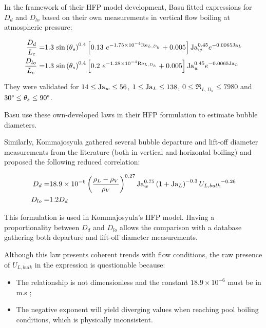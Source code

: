 \npar

In the framework of their HFP model development, Basu \etal fitted expressions for $D_{d}$ and $D_{lo}$ based on their own measurements in vertical flow boiling at atmospheric pressure:

\begin{align}
\frac{D_{d}}{L_{c}} =& 1.3~\sin{\theta_{s}}^{0.4}\crocht{ 0.13\ e^{-1.75\times 10^{-4} \Re_{L,D_{h}}}+0.005 }\Ja_{w}^{0.45}e^{-0.0065\Ja_{L}}
\label{eq:dd_basu}\\
%
\frac{D_{lo}}{L_{c}} =& 1.3~ \sin{\theta_{s}}^{0.4}\crocht{ 0.2\ e^{-1.28\times 10^{-4} \Re_{L,D_{h}}}+0.005 }\Ja_{w}^{0.45}e^{-0.0065\Ja_{L}}
\label{eq:dlo_basu}
\end{align}

They were validated for $14 \leq \mathrm{Ja}_{w} \leq 56$, $1 \leq \mathrm{Ja}_{L} \leq 138$, $0\leq \Re_{L,D_{h}} \leq 7980$ and $30\degree \leq \theta_{s} \leq 90 \degree$.


\begin{note*}{}
Basu \etal use these own-developed laws in their HFP formulation to estimate bubble diameters.
\end{note*}

\npar

Similarly, Kommajosyula\cite{kommajosyula_development_2020} gathered several bubble departure and lift-off diameter measurements from the literature (both in vertical and horizontal boiling) and proposed the following reduced correlation:

\begin{align}
D_{d} =& 18.9 \times 10^{-6} \left( \frac{\rho_{L}-\rho_{V}}{\rho_{V}} \right)^{0.27} \mathrm{Ja}_{w}^{0.75} \left( 1+\mathrm{Ja}_{L} \right)^{-0.3} {U_{L,bulk}}^{-0.26}
\label{eq:dd_komma} \\
D_{lo} =& 1.2 D_{d}
\label{eq:dlo_komma}
\end{align}

\begin{note*}{}
This formulation is used in Kommajosyula's HFP model. Having a proportionality between $D_{d}$ and $D_{lo}$ allows the comparison with a database gathering both departure and lift-off diameter measurements.
\end{note*}

Although this law presents coherent trends with flow conditions, the raw presence of $U_{L,bulk}$ in the expression is questionable because:

\begin{itemize}
\item The relationship is not dimensionless and the constant $18.9 \times 10^{-6}$ must be in m.s ;
\item The negative exponent will yield diverging values when reaching pool boiling conditions, which is physically inconsistent.
\end{itemize}


